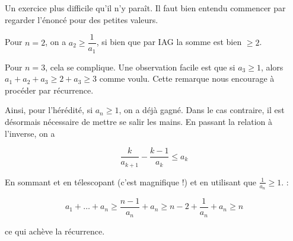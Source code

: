 \begin{sol}
Un exercice plus difficile qu'il n'y paraît. Il faut bien entendu commencer par regarder l'énoncé pour des petites valeurs.

Pour $n=2$, on a $a_2\geqslant \dfrac1{a_1}$, si bien que par IAG la somme est bien $\geqslant 2$.

Pour $n=3$, cela se complique. Une observation facile est que si $a_3\geqslant 1$, alors $a_1+a_2+a_3\geqslant 2+a_3 \geqslant 3$ comme voulu. Cette remarque nous encourage à procéder par récurrence.

Ainsi, pour l'hérédité, si $a_n\geqslant 1$, on a déjà gagné. Dans le cas contraire, il est désormais nécessaire de mettre se salir les mains. En passant la relation à l'inverse, on a

\[\frac{k}{a_{k+1}}- \frac{k-1}{a_k} \leqslant a_k\]

En sommant et en télescopant (c'est magnifique !) et en utilisant que $\frac1{a_n}\geqslant 1$. :

\[a_1+ \ldots + a_n \geqslant \frac{n-1}{a_n} + a_n \geqslant n-2 + \frac1{a_n}+a_n \geqslant n\]

ce qui achève la récurrence.
\end{sol}